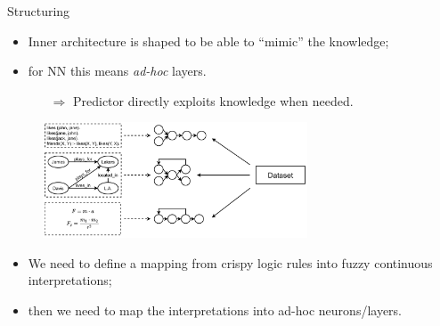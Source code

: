 \documentclass[presentation]{beamer}\mode<presentation>{\usetheme{AMSBolognaFC}}
\begin{document}
\begin{frame}[allowframebreaks]{Structuring}
    \begin{itemize}
        \item Inner architecture is shaped to be able to ``mimic'' the knowledge;
        \item for NN this means \emph{ad-hoc} layers.
        \begin{itemize}
            \item[$\Rightarrow$] Predictor directly exploits knowledge when needed.
        \end{itemize} 
    \end{itemize}
    \begin{figure}
        \centering
        \includegraphics[width=0.7\textwidth]{figures/ski-structuring}
    \end{figure}
    
    \framebreak
    
    \begin{itemize}
        \item We need to define a mapping from crispy logic rules into fuzzy continuous interpretations;
        \item then we need to map the interpretations into ad-hoc neurons/layers.
    \end{itemize}   
    
    \framebreak
    

\end{frame}
\end{document}
